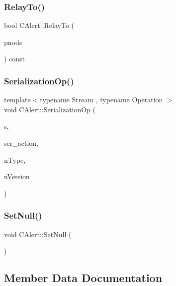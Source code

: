 \subsubsection{\texorpdfstring{Relay\+To()}{RelayTo()}}
{\footnotesize\ttfamily bool C\+Alert\+::\+Relay\+To (\begin{DoxyParamCaption}\item[{\mbox{\hyperlink{class_c_node}{C\+Node}} $\ast$}]{pnode }\end{DoxyParamCaption}) const}

\mbox{\label{class_c_alert_a51d73ab316bb42e65b87ec14ac536b14}} 
\subsubsection{\texorpdfstring{Serialization\+Op()}{SerializationOp()}}
{\footnotesize\ttfamily template$<$typename Stream , typename Operation $>$ \\
void C\+Alert\+::\+Serialization\+Op (\begin{DoxyParamCaption}\item[{Stream \&}]{s,  }\item[{Operation}]{ser\+\_\+action,  }\item[{int}]{n\+Type,  }\item[{int}]{n\+Version }\end{DoxyParamCaption})\hspace{0.3cm}{\ttfamily [inline]}}

\mbox{\label{class_c_alert_a93fd881c55ab448213787f49e316eb99}} 
\subsubsection{\texorpdfstring{Set\+Null()}{SetNull()}}
{\footnotesize\ttfamily void C\+Alert\+::\+Set\+Null (\begin{DoxyParamCaption}{ }\end{DoxyParamCaption})}



\subsection{Member Data Documentation}
\mbox{\label{class_c_alert_aca9310112e67fb38ef88f385a4ac6fc0}} 
